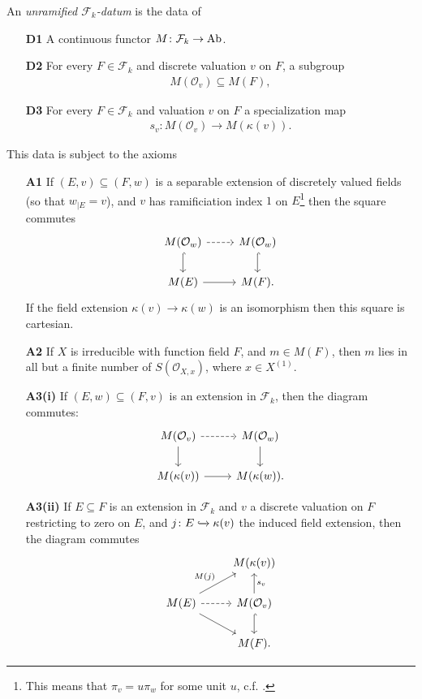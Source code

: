 \documentclass[11pt,openany]{book}
\begin{document}
\begin{definition} \cite[2.6,2.9]{Morel}
An \textit{unramified $\mathcal{F}_k$-datum} is the data of
\begin{enumerate}
    \item[\textbf{D1}] A continuous functor $M \colon \mathcal{F}_k \to \mathrm{Ab}$.
    \item[\textbf{D2}] For every $F\in \mathcal{F}_k$ and discrete valuation $v$ on $F$, a subgroup
    \begin{align*}
        M(\mathcal{O}_v) \subseteq M(F),
    \end{align*}
    \item[\textbf{D3}] For every $F\in \mathcal{F}_k$ and valuation $v$ on $F$ a specialization map
    \begin{align*}
        s_v \colon M(\mathcal{O}_v) \to M(\kappa(v)).
    \end{align*}
\end{enumerate}
This data is subject to the axioms
\begin{enumerate}
    \item[\textbf{A1}] If $(E,v) \subseteq (F,w)$ is a separable extension of discretely valued fields (so that $w_{|E} = v$), and $v$ has ramificiation index $1$ on $E$\footnote{%
    This means that $\pi_v = u\pi_w$ for some unit $u$, c.f. \cite[09E4]{Stacks}.
    }
    then the square commutes
\[ \begin{tikzcd}
    M(\mathcal{O}_w)\dar[hook]\rar[dashed] & M(\mathcal{O}_w)\dar[hook]\\
    M(E)\rar & M(F).
\end{tikzcd} \]
If the field extension $\kappa(v) \to \kappa(w)$ is an isomorphism then this square is cartesian.

    \item[\textbf{A2}] If $X$ is irreducible with function field $F$, and $m\in M(F)$, then $m$ lies in all but a finite number of $S(\mathcal{O}_{X,x})$, where $x\in X^{(1)}$.
    \item[\textbf{A3(i)}] If $(E,w) \subseteq (F,v)$ is an extension in $\mathcal{F}_k$, then the diagram commutes:
\[ \begin{tikzcd}
    M(\mathcal{O}_v)\dar\rar[dashed] & M(\mathcal{O}_w)\dar\\
    M(\kappa(v))\rar & M(\kappa(w)).
\end{tikzcd} \]
    
    \item[\textbf{A3(ii)}] If $E \subseteq F$ is an extension in $\mathcal{F}_k$ and $v$ a discrete valuation on $F$ restricting to zero on $E$, and $j \colon E \xhookrightarrow{} \kappa(v)$ the induced field extension, then the diagram commutes
\[ \begin{tikzcd}
     & M(\kappa(v))\\
    M(E)\ar[ur,"M(j)" above left]\ar[dr]\rar[dashed] & M(\mathcal{O}_v)\dar[hook]\uar["s_v" right]\\
     & M(F).
\end{tikzcd} \]
    

\end{enumerate}
\end{definition}
\end{document}
